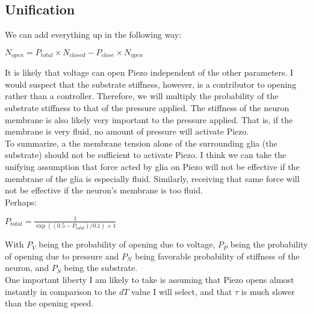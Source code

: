 \documentclass[12pt]{amsart}
\begin{document}
\subsection{Unification} We can add everything up in the following way: 

\bigskip

\begin{center}

$N_{open} = P_{total} \times N_{closed} - P_{close}\times N_{open}$

\end{center}

\bigskip

It is likely that voltage can open Piezo independent of the other parameters. I would suspect that the substrate stiffness, however, is a contributor to opening rather than a controller. Therefore, we will multiply the probability of the substrate stiffness to that of the pressure applied. The stiffness of the neuron membrane is also likely very important to the pressure applied. That is, if the membrane is very fluid, no amount of pressure will activate Piezo. \\

To summarize, a the membrane tension alone of the surrounding glia (the substrate) should not be sufficient to activate Piezo. I think we can take the unifying assumption that force acted by glia on Piezo will not be effective if the membrane of the glia is especially fluid. Similarly, receiving that same force will not be effective if the neuron's membrane is too fluid. \\

Perhaps: 

\bigskip

\begin{center}

    $P_{total} = \frac{1}{\exp((0.5 - P_{total})/0.1) + 1}$
    
\end{center}

\bigskip

With $P_V$ being the probability of opening due to voltage, $P_P$ being the probability of opening due to pressure and $P_N$ being favorable probability of stiffness of the neuron, and $P_S$ being the substrate.\\

One important liberty I am likely to take is assuming that Piezo opens almost instantly in comparison to the $dT$ value I will select, and that $\tau$ is much slower than the opening speed.

\end{document}
